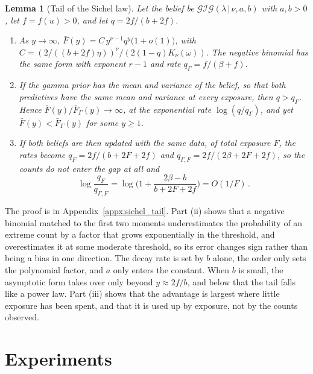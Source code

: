 \documentclass[twoside]{article}
\newcommand\given[1][]{\,#1\vert\,}
\providecommand{\Gig}{\mathcal{GIG}}  %
\theoremstyle{plain}
\newtheorem{lemma}{Lemma}
\theoremstyle{definition}
\theoremstyle{remark}
\begin{document}
\begin{lemma}[Tail of the Sichel law]
    \label{lem:sichel_tail}
    Let the belief be $\Gig(\lambda \given \nu, a, b)$ with $a, b > 0$, let $f = f(u) > 0$, and let $q = 2f / (b + 2f)$.
    \begin{enumerate}
        \item[(i)] As $y \to \infty$, $\bar{F}(y) = C \, y^{\nu - 1} q^{y} \big(1 + o(1)\big)$, with $C = (2/((b + 2f)\eta))^{\nu} / (2 (1 - q) K_{\nu}(\omega))$. The negative binomial has the same form with exponent $r - 1$ and rate $q_{\Gamma} = f / (\beta + f)$.
        \item[(ii)] If the gamma prior has the mean and variance of the belief, so that both predictives have the same mean and variance at every exposure, then $q > q_{\Gamma}$. Hence $\bar{F}(y) / \bar{F}_{\Gamma}(y) \to \infty$, at the exponential rate $\log(q / q_{\Gamma})$, and yet $\bar{F}(y) < \bar{F}_{\Gamma}(y)$ for some $y \geq 1$.
        \item[(iii)] If both beliefs are then updated with the same data, of total exposure $F$, the rates become $q_F = 2f/(b + 2F + 2f)$ and $q_{\Gamma, F} = 2f / (2\beta + 2F + 2f)$, so the counts do not enter the gap at all and
        \begin{equation*}
            \log \frac{q_F}{q_{\Gamma, F}} = \log \Big( 1 + \frac{2\beta - b}{b + 2F + 2f} \Big) = O(1/F) \,.
        \end{equation*}
    \end{enumerate}
\end{lemma}

The proof is in Appendix~\ref{appx:sichel_tail}.
Part (ii) shows that a negative binomial matched to the first two moments underestimates the probability of an extreme count by a factor that grows exponentially in the threshold, and overestimates it at some moderate threshold, so its error changes sign rather than being a bias in one direction.
The decay rate is set by $b$ alone, the order only sets the polynomial factor, and $a$ only enters the constant.
When $b$ is small, the asymptotic form takes over only beyond $y \approx 2f/b$, and below that the tail falls like a power law.
Part (iii) shows that the advantage is largest where little exposure has been spent, and that it is used up by exposure, not by the counts observed.

\section{Experiments}
\label{sec:experiments}
\end{document}
